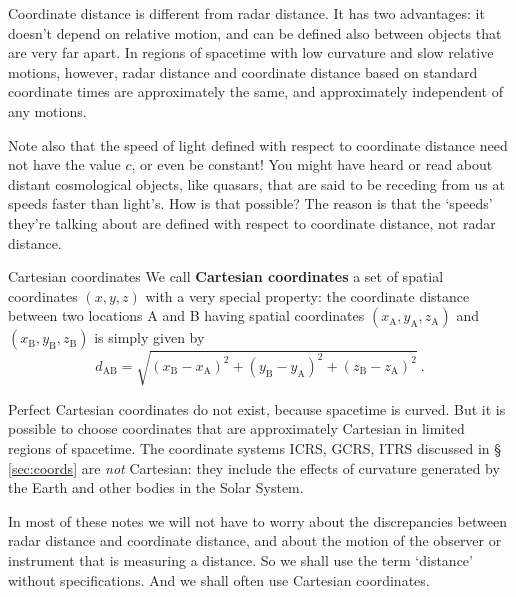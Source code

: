 \documentclass[a4paper,12pt,%
onecolumn,oneside,%
british%
]{memoir}
\renewcommand*{\|}[1][]{\nonscript\:#1\vert\nonscript\:\mathopen{}}
\newcommand*{\sect}{\S}%
\newcommand*{\yc}{c} %
\begin{document}
Coordinate distance is different from radar distance. It has two advantages: it doesn't depend on relative motion, and can be defined also between objects that are very far apart. In regions of spacetime with low curvature and slow relative motions, however, radar distance and coordinate distance based on standard coordinate times are approximately the same, and approximately independent of any motions.

Note also that the speed of light defined with respect to coordinate distance need not have the value $\yc$, or even be constant! You might have heard or read about  distant cosmological objects, like quasars, that are said to be receding from us at speeds faster than light's. How is that possible? The reason is that the \enquote*{speeds} they're talking about are defined with respect to coordinate distance, not radar distance.

\medskip

\begin{definition}{Cartesian coordinates}\label{def:cartesian_coords}
We call \textbf{Cartesian coordinates} a set of spatial coordinates $(x,y,z)$ with a very special property: the coordinate distance between two locations A and B having spatial coordinates $(x_{\textrm{A}}, y_{\textrm{A}}, z_{\textrm{A}})$ and $(x_{\textrm{B}}, y_{\textrm{B}}, z_{\textrm{B}})$ is simply given by
\begin{equation}
  \label{eq:distance_cartesian}
  d_{\textrm{A}\textrm{B}} = \sqrt{
    (x_{\textrm{B}} - x_{\textrm{A}})^{2} +
    (y_{\textrm{B}} - y_{\textrm{A}})^{2} +
    (z_{\textrm{B}} - z_{\textrm{A}})^{2}
  } \ .
\end{equation}
\end{definition}

Perfect Cartesian coordinates do not exist, because spacetime is curved. But it is possible to choose coordinates that are approximately Cartesian in limited regions of spacetime. The coordinate systems ICRS, GCRS, ITRS discussed in \sect\,\ref{sec:coords} are \emph{not} Cartesian: they include the effects of curvature generated by the Earth and other bodies in the Solar System.

In most of these notes we will not have to worry about the discrepancies between radar distance and coordinate distance, and about the motion of the observer or instrument that is measuring a distance. So we shall use the term \enquote*{distance} without specifications. And we shall often use Cartesian coordinates.
\end{document}

